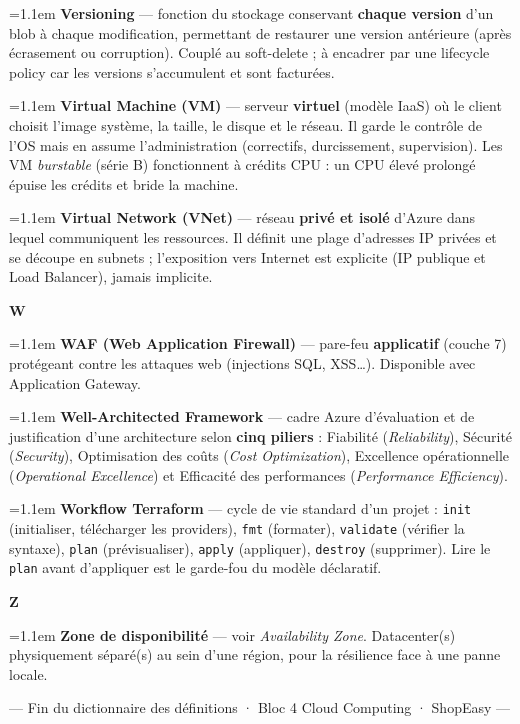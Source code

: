 \documentclass[11pt,a4paper]{article}
\newcommand{\co}[1]{\texttt{\small #1}}
\newcommand{\lettre}[1]{%
  \par\addvspace{9pt}\needspace{4.5\baselineskip}%
  \markright{#1}%
  {\noindent\sffamily\bfseries\Large\color{azure}#1}%
  \nobreak\vspace{0.4mm}{\color{azure!45}\hrule height 1pt}\nobreak\vspace{3mm}\par}
\newcommand{\df}[2]{%
  \par\addvspace{4pt}\needspace{2\baselineskip}%
  \hangindent=1.1em\hangafter=1
  {\sffamily\bfseries\color{azuredark}#1} — #2\par}
\begin{document}
\df{Versioning}{fonction du stockage conservant \textbf{chaque version} d'un blob à chaque modification, permettant de restaurer une version antérieure (après écrasement ou corruption). Couplé au soft-delete ; à encadrer par une lifecycle policy car les versions s'accumulent et sont facturées.}

\df{Virtual Machine (VM)}{serveur \textbf{virtuel} (modèle IaaS) où le client choisit l'image système, la taille, le disque et le réseau. Il garde le contrôle de l'OS mais en assume l'administration (correctifs, durcissement, supervision). Les VM \emph{burstable} (série B) fonctionnent à crédits CPU : un CPU élevé prolongé épuise les crédits et bride la machine.}

\df{Virtual Network (VNet)}{réseau \textbf{privé et isolé} d'Azure dans lequel communiquent les ressources. Il définit une plage d'adresses IP privées et se découpe en subnets ; l'exposition vers Internet est explicite (IP publique et Load Balancer), jamais implicite.}

\lettre{W}

\df{WAF (Web Application Firewall)}{pare-feu \textbf{applicatif} (couche 7) protégeant contre les attaques web (injections SQL, XSS\dots). Disponible avec Application Gateway.}

\df{Well-Architected Framework}{cadre Azure d'évaluation et de justification d'une architecture selon \textbf{cinq piliers} : Fiabilité (\emph{Reliability}), Sécurité (\emph{Security}), Optimisation des coûts (\emph{Cost Optimization}), Excellence opérationnelle (\emph{Operational Excellence}) et Efficacité des performances (\emph{Performance Efficiency}).}

\df{Workflow Terraform}{cycle de vie standard d'un projet : \co{init} (initialiser, télécharger les providers), \co{fmt} (formater), \co{validate} (vérifier la syntaxe), \co{plan} (prévisualiser), \co{apply} (appliquer), \co{destroy} (supprimer). Lire le \co{plan} avant d'appliquer est le garde-fou du modèle déclaratif.}

\lettre{Z}

\df{Zone de disponibilité}{voir \emph{Availability Zone}. Datacenter(s) physiquement séparé(s) au sein d'une région, pour la résilience face à une panne locale.}

\vfill
\begin{center}{\sffamily\small\color{black!45}— Fin du dictionnaire des définitions · Bloc 4 Cloud Computing · ShopEasy —}\end{center}
\end{document}

